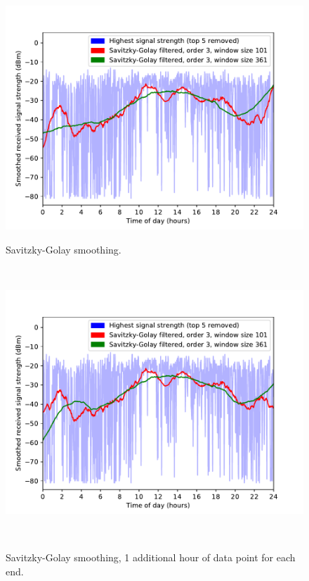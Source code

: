 \documentclass[a4paper, 11pt]{article}
\begin{document}
\begin{figure}[ht]
\begin{minipage}[t]{0.45\textwidth}
\centering
\includegraphics[width=\textwidth]{savitzky_0hours}
\caption{Savitzky-Golay smoothing.}
\label{savitzky_0}
\end{minipage}\
\begin{minipage}[t]{0.45\textwidth}
\centering
\includegraphics[width=\textwidth]{savitzky_1hour}
\caption{Savitzky-Golay smoothing, 1 additional hour of data point for each end.}
\label{savitzky_1}
\end{minipage}\
\end{figure}
\end{document}
